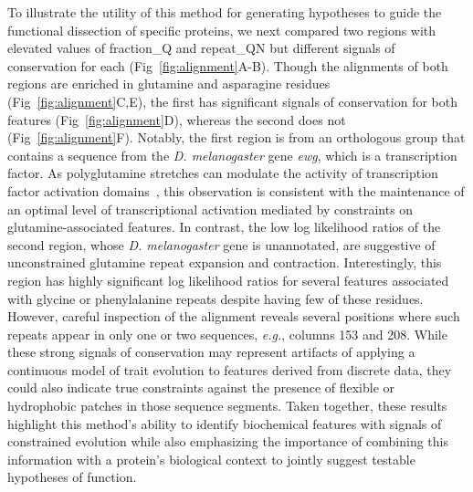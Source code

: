 To illustrate the utility of this method for generating hypotheses to guide the functional dissection of specific proteins, we next compared two regions with elevated values of fraction\_Q and repeat\_QN but different signals of conservation for each (Fig~\ref{fig:alignment}A-B). Though the alignments of both regions are enriched in glutamine and asparagine residues (Fig~\ref{fig:alignment}C,E), the first has significant signals of conservation for both features (Fig~\ref{fig:alignment}D), whereas the second does not (Fig~\ref{fig:alignment}F). Notably, the first region is from an orthologous group that contains a sequence from the \textit{D. melanogaster} gene \textit{ewg}, which is a transcription factor. As polyglutamine stretches can modulate the activity of transcription factor activation domains~\cite{Mitchell1989, Gerber1994}, this observation is consistent with the maintenance of an optimal level of transcriptional activation mediated by constraints on glutamine-associated features. In contrast, the low log likelihood ratios of the second region, whose \textit{D. melanogaster} gene is unannotated, are suggestive of unconstrained glutamine repeat expansion and contraction. Interestingly, this region has highly significant log likelihood ratios for several features associated with glycine or phenylalanine repeats despite having few of these residues. However, careful inspection of the alignment reveals several positions where such repeats appear in only one or two sequences, \textit{e.g.}, columns 153 and 208. While these strong signals of conservation may represent artifacts of applying a continuous model of trait evolution to features derived from discrete data, they could also indicate true constraints against the presence of flexible or hydrophobic patches in those sequence segments. Taken together, these results highlight this method's ability to identify biochemical features with signals of constrained evolution while also emphasizing the importance of combining this information with a protein's biological context to jointly suggest testable hypotheses of function.

